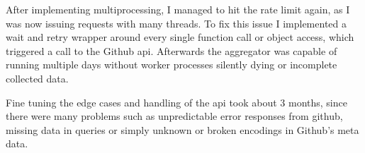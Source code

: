 After implementing multiprocessing, I managed to hit the rate limit again, as I was now issuing requests with many threads.
To fix this issue I implemented a wait and retry wrapper around every single function call or object access, which triggered a call to the Github \ac{api}.
Afterwards the aggregator was capable of running multiple days without worker processes silently dying or incomplete collected data.

Fine tuning the edge cases and handling of the \ac{api} took about 3 months, since there were many problems such as unpredictable error responses from github, missing data in queries or simply unknown or broken encodings in Github's meta data.


